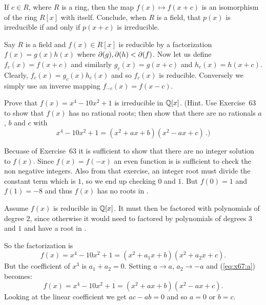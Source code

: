\begin{myenumerate}
\item
\begin{excopy}
If \(c\in R\), where $R$ is a ring, then the map
\(f(x) \mapsto f(x+c)\) is an isomorphism of the ring \(R[x]\) with
itself. Conclude, when $R$ is a field, that \(p(x)\)
is irreducible if and only if \(p(x+c)\) is irreducible.
\end{excopy}

Say $R$ is a field and \(f(x)\in R[x]\) is reducible
by a factorization \(f(x)=g(x)h(x)\) where \(\partial(g),\partial(h)<\partial(f)\).
Now let us define \(f_c(x)=f(x+c)\) and similarly
\(g_c(x)=g(x+c)\) and
\(h_c(x)=h(x+c)\). Clearly, \(f_c(x)=g_c(x)h_c(x)\)
and so \(f_c(x)\) is reducible.
Conversely we simply use an inverse mapping \(f_{-c}(x)=f(x-c)\).

\item
\begin{excopy}
Prove that \(f(x)=x^4 - 10x^2 + 1\) is irreducible in \(\mathbb{Q}[x]\).
(Hint. Use Exercise~63 to show that \(f(x)\) has no rational roots;
then show that there are no rationals $a$, $b$ and $c$ with
\begin{equation*}
x^4 - 10x^2+1 = (x^2+ax+b)(x^2-ax+c)\,.)
\end{equation*}
\end{excopy}

Becuase of Exercise~63 it is sufficient to show that there are
no integer solution to \(f(x)\).
Since \(f(x)=f(-x)\) an even function is is sufficient to check
the non negative integers.
Also from that exercise, an integer root must divide
the constant term which is $1$, so we end up checking $0$ and $1$.
But \(f(0)=1\) and \(f(1)=-8\)
and thus \(f(x)\) has no roots in \Q.

Assume \(f(x)\) is reducible in \(\mathbb{Q}[x]\).
It must then be factored with polynomials of degree $2$,
since otherwise it would need to factored
by polynomials of degrees $3$ and $1$ and have a root in \Q.

So the factorization is
\begin{equation} \label{eq:x67:a}
  f(x)= x^4 - 10x^2 + 1 = (x^2+a_1x + b)(x^2+a_2x + c).
\end{equation}
But the coefficient of \(x^3\) is \(a_1+a_2=0\).
Setting
\(a\rightarrow a\), \(a_2\rightarrow -a\)
and (\ref{eq:x67:a}) becomes:
\begin{equation}
  f(x) = x^4 - 10x^2 + 1 = (x^2 + ax + b)(x^2 - ax + c).
\end{equation}
Looking at the linear coefficient we get \(ac-ab=0\) and so \(a=0\)
or \(b=c\).


\end{myenumerate}
